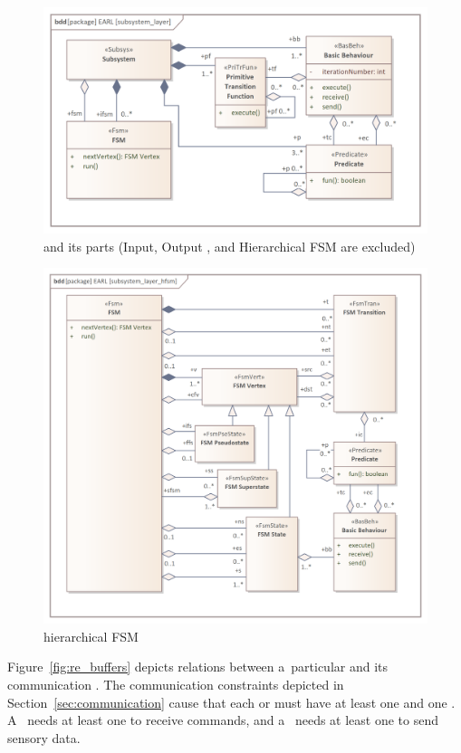 \documentclass[11pt,oneside,a4paper]{article}
\newcommand{\Figure}[0]{Figure}
\begin{document}
	\begin{figure}[H]
		\centering
		\centering
		\includegraphics[width=.8\textwidth]{img/basic_earl_model/subsystem_layer.png}
		\caption{\Subsystem{} and its parts (Input, Output \Buffers{}, \InternalMemory{} and Hierarchical FSM are excluded)}
		\label{fig:warstwa_podsystemu}
	\end{figure}	

	\begin{figure}[H]
		\centering
		\centering
		\includegraphics[width=.75\textwidth]{img/basic_earl_model/subsystem_layer_hfsm.png}
		\caption{\Subsystem{} hierarchical FSM}
		\label{fig:podsystem_hfsm}
	\end{figure}	
	
	\Figure{}~\ref{fig:re_buffers} depicts relations between a~particular \Subsystem{} and its communication \Buffers{}.
	The communication constraints depicted in Section~\ref{sec:communication} cause that each \VirtualReceptor{} or \VirtualEffector{}
	must have at least one \InputBuffer{} and one \OutputBuffer{}. A~\RealEffector{} needs at least one \InputBuffer{} to receive commands,
	and a~\RealReceptor{} needs at least one \OutputBuffer{} to send sensory data.
	
\end{document}
